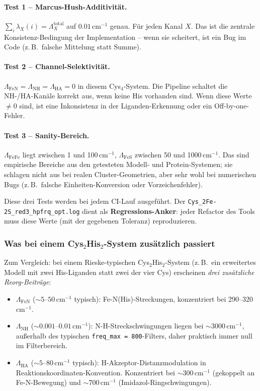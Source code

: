 \documentclass[11pt,a4paper,twoside]{article}
\theoremstyle{remark}
\begin{document}
\paragraph{Test 1 -- Marcus-Hush-Additivit\"at.}
$\sum_i \lambda_X(i) = \Lambda_X^\text{total}$ auf $0.01\,$cm$^{-1}$
genau. F\"ur jeden Kanal $X$. Das ist die zentrale
Konsistenz-Bedingung der Implementation -- wenn sie scheitert, ist
ein Bug im Code (z.\,B.\ falsche Mittelung statt Summe).

\paragraph{Test 2 -- Channel-Selektivit\"at.}
$\Lambda_\text{FeN} = \Lambda_\text{NH} = \Lambda_\text{HA} = 0$ in
diesem Cys$_4$-System. Die Pipeline schaltet die NH-/HA-Kan\"ale
korrekt aus, wenn keine His vorhanden sind. Wenn diese Werte $\neq 0$
sind, ist eine Inkonsistenz in der Liganden-Erkennung oder ein
Off-by-one-Fehler.

\paragraph{Test 3 -- Sanity-Bereich.}
$\Lambda_\text{FeFe}$ liegt zwischen 1 und 100\,cm$^{-1}$,
$\Lambda_\text{FeS}$ zwischen 50 und 1000\,cm$^{-1}$. Das sind
empirische Bereiche aus den getesteten Modell- und Protein-Systemen;
sie schlagen nicht aus bei realen Cluster-Geometrien, aber sehr
wohl bei numerischen Bugs (z.\,B.\ falsche Einheiten-Konversion oder
Vorzeichenfehler).

Diese drei Tests werden bei jedem CI-Lauf ausgef\"uhrt. Der
\texttt{Cys\_2Fe-2S\_red3\_hpfrq\_opt.log} dient als
\textbf{Regressions-Anker}: jeder Refactor des Tools muss diese
Werte (mit der gegebenen Toleranz) reproduzieren.

\subsubsection*{Was bei einem Cys$_2$His$_2$-System zus\"atzlich passiert}

Zum Vergleich: bei einem Rieske-typischen Cys$_2$His$_2$-System
(z.\,B.\ ein erweitertes Modell mit zwei His-Liganden statt zwei der
vier Cys) erscheinen \emph{drei zus\"atzliche Reorg-Beitr\"age}:

\begin{itemize}\setlength{\itemsep}{0pt}
  \item \textbf{$\Lambda_\text{FeN}$} ($\sim 5$--$50$\,cm$^{-1}$
        typisch): Fe-N(His)-Streckungen, konzentriert bei
        290--320\,cm$^{-1}$.
  \item \textbf{$\Lambda_\text{NH}$} ($\sim 0.001$--$0.01$\,cm$^{-1}$):
        N-H-Streckschwingungen liegen bei $\sim 3000$\,cm$^{-1}$,
        au{\ss}erhalb des typischen \texttt{freq\_max = 800}-Filters,
        daher praktisch immer null im Filterbereich.
  \item \textbf{$\Lambda_\text{HA}$} ($\sim 5$--$80$\,cm$^{-1}$
        typisch): H-Akzeptor-Distanzmodulation in
        Reaktionskoordinaten-Konvention. Konzentriert bei
        $\sim 300$\,cm$^{-1}$ (gekoppelt an Fe-N-Bewegung) und
        $\sim 700$\,cm$^{-1}$ (Imidazol-Ringschwingungen).
\end{itemize}
\end{document}
